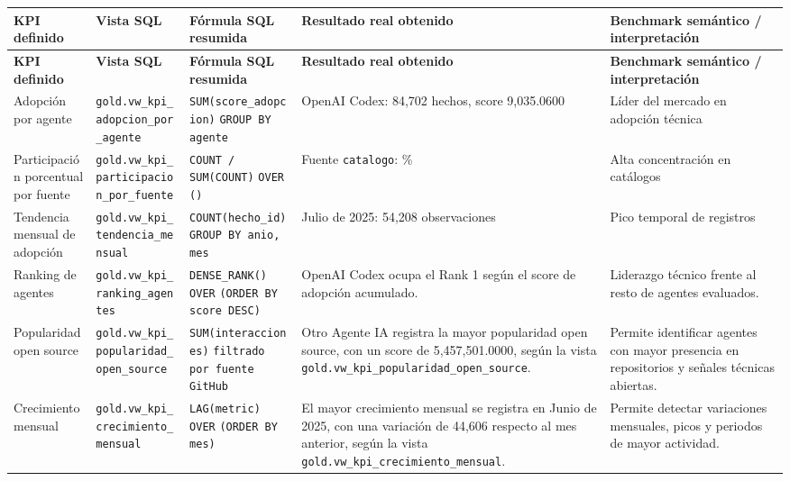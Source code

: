 \documentclass[12pt,a4paper]{article}
\newcommand{\pathcode}[1]{\begingroup\scriptsize\ttfamily\nolinkurl{#1}\endgroup}
\begin{document}
\scriptsize
\begin{longtable}{|P{2.5cm}|P{3.5cm}|P{3.2cm}|P{3.3cm}|P{2.5cm}|}
\hline
{}
\textbf{KPI definido} & \textbf{Vista SQL} & \textbf{F\'ormula SQL resumida} & \textbf{Resultado real obtenido} & \textbf{Benchmark sem\'antico / interpretaci\'on} \\ \hline
\endfirsthead
\hline
{}
\textbf{KPI definido} & \textbf{Vista SQL} & \textbf{F\'ormula SQL resumida} & \textbf{Resultado real obtenido} & \textbf{Benchmark sem\'antico / interpretaci\'on} \\ \hline
\endhead
Adopci\'on por agente & \pathcode{gold.vw_kpi_adopcion_por_agente} & \texttt{SUM(score\_adopcion)} \newline \texttt{GROUP BY agente} & OpenAI Codex: 84,702 hechos, score 9,035.0600 & L\'ider del mercado en adopci\'on t\'ecnica \\ \hline
Participaci\'on porcentual por fuente & \pathcode{gold.vw_kpi_participacion_por_fuente} & \texttt{COUNT / SUM(COUNT)} \newline \texttt{OVER ()} & Fuente \pathcode{catalogo}: \% & Alta concentraci\'on en cat\'alogos \\ \hline
Tendencia mensual de adopci\'on & \pathcode{gold.vw_kpi_tendencia_mensual} & \texttt{COUNT(hecho\_id)} \newline \texttt{GROUP BY anio, mes} & Julio de 2025: 54,208 observaciones & Pico temporal de registros \\ \hline
Ranking de agentes & \pathcode{gold.vw_kpi_ranking_agentes} & \texttt{DENSE\_RANK() OVER} \newline \texttt{(ORDER BY score DESC)} & OpenAI Codex ocupa el Rank 1 seg\'un el score de adopci\'on acumulado. & Liderazgo t\'ecnico frente al resto de agentes evaluados. \\ \hline
Popularidad open source & \pathcode{gold.vw_kpi_popularidad_open_source} & \texttt{SUM(interacciones)} \newline \texttt{filtrado por fuente GitHub} & Otro Agente IA registra la mayor popularidad open source, con un score de 5,457,501.0000, seg\'un la vista \pathcode{gold.vw_kpi_popularidad_open_source}. & Permite identificar agentes con mayor presencia en repositorios y se\~nales t\'ecnicas abiertas. \\ \hline
Crecimiento mensual & \pathcode{gold.vw_kpi_crecimiento_mensual} & \texttt{LAG(metric) OVER} \newline \texttt{(ORDER BY mes)} & El mayor crecimiento mensual se registra en Junio de 2025, con una variaci\'on de 44,606 respecto al mes anterior, seg\'un la vista \pathcode{gold.vw_kpi_crecimiento_mensual}. & Permite detectar variaciones mensuales, picos y periodos de mayor actividad. \\ \hline

\end{longtable}
\end{document}

